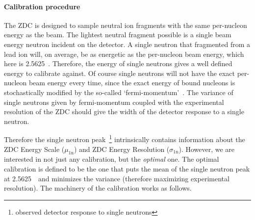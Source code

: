 \paragraph{Calibration procedure}
The ZDC is designed to sample neutral ion fragments with the same per-nucleon energy as the beam.  The lightest neutral fragment possible is a single beam energy neutron incident on the detector.  A single neutron that fragmented from a lead ion will, on average, be as energetic as the per-nucleon beam energy, which here is 2.5625~\TeV.  Therefore, the energy of single neutrons gives a well defined energy to calibrate against.  Of course single neutrons will not have the exact per-nucleon beam energy every time, since the exact energy of bound nucleons is stochastically modified by the so-called `fermi-momentum'~.  The variance of single neutrons given by fermi-momentum coupled with the experimental resolution of the ZDC should give the width of the detector response to a single neutron.

Therefore the single neutron peak~\footnote{observed detector response to single neutrons} intrinsically contains information about the ZDC Energy Scale ($\mu_{\mathrm{1n}}$) and ZDC Energy Resolution ($\sigma_{\mathrm{1n}}$).  However, we are interested in not just any calibration, but the \textit{optimal} one. The optimal calibration is defined to be the one that puts the mean of the single neutron peak at 2.5625~\TeV\ and minimizes the variance (therefore maximizing experimental resolution).  The machinery of the calibration works as follows.

